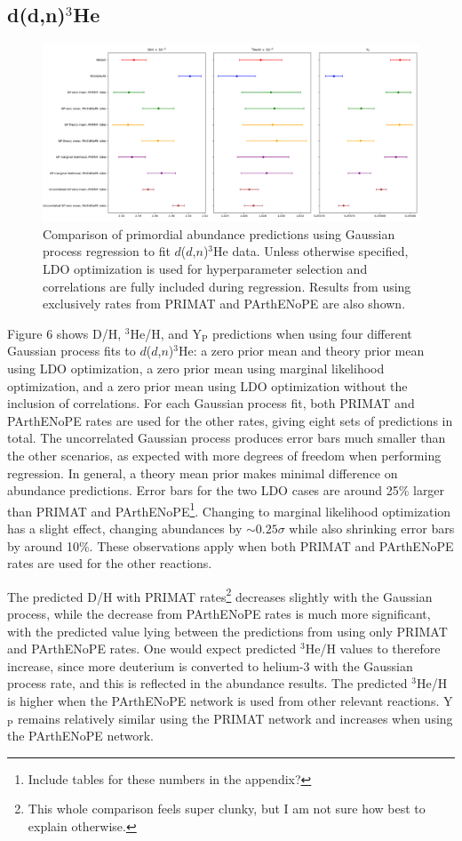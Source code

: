 \documentclass[%
 reprint,
superscriptaddress,
nofootinbib,
 amsmath,amssymb,
 aps,
 pra,
]{revtex4-2}
\begin{document}
\subsection{d(d,n)$^3$He}

\begin{figure}
	\centering
	\includegraphics[width=0.98\linewidth]{Figures/ddhe3n_comp.png}
	\caption{Comparison of primordial abundance predictions using Gaussian process regression to fit $d$($d$,$n$)$^3$He data. Unless otherwise specified, LDO optimization is used for hyperparameter selection and correlations are fully included during regression. Results from using exclusively rates from PRIMAT and PArthENoPE are also shown. }
\end{figure}

Figure 6 shows D/H, $^3$He/H, and Y$_\text{P}$ predictions when using four different Gaussian process fits to $d$($d$,$n$)$^3$He: a zero prior mean and theory prior mean using LDO optimization, a zero prior mean using marginal likelihood optimization, and a zero prior mean using LDO optimization without the inclusion of correlations. For each Gaussian process fit, both PRIMAT and PArthENoPE rates are used for the other rates, giving eight sets of predictions in total. The uncorrelated Gaussian process produces error bars much smaller than the other scenarios, as expected with more degrees of freedom when performing regression. In general, a theory mean prior makes minimal difference on abundance predictions. Error bars for the two LDO cases are around 25\% larger than PRIMAT and PArthENoPE\footnote{Include tables for these numbers in the appendix?}. Changing to marginal likelihood optimization has a slight effect, changing abundances by $\sim0.25\sigma$ while also shrinking error bars by around 10\%. These observations apply when both PRIMAT and PArthENoPE rates are used for the other reactions. 

The predicted D/H with PRIMAT rates\footnote{This whole comparison feels super clunky, but I am not sure how best to explain otherwise. } decreases slightly with the Gaussian process, while the decrease from PArthENoPE rates is much more significant, with the predicted value lying between the predictions from using only PRIMAT and PArthENoPE rates. One would expect predicted $^3$He/H values to therefore increase, since more deuterium is converted to helium-3 with the Gaussian process rate, and this is reflected in the abundance results. The predicted $^3$He/H is higher when the PArthENoPE network is used from other relevant reactions. Y$_\text{P}$ remains relatively similar using the PRIMAT network and increases when using the PArthENoPE network. 
\end{document}
